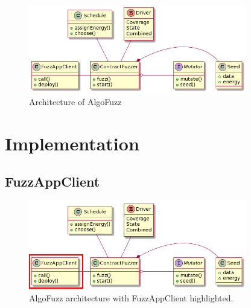 \begin{figure}[htbp]
    \centering
    \includegraphics[width=0.85\textwidth]{figures/arc.png}
    \caption{Architecture of AlgoFuzz}\label{fig:algofuzz-architecture}
\end{figure}

\section{Implementation} \label{section:implementation}

\subsection*{FuzzAppClient}

\begin{figure}[htbp]
    \centering
    \includegraphics[width=0.85\textwidth]{figures/arc-client.png}
    \caption{AlgoFuzz architecture with FuzzAppClient highlighted.}\label{fig:architecture-client}
\end{figure}

